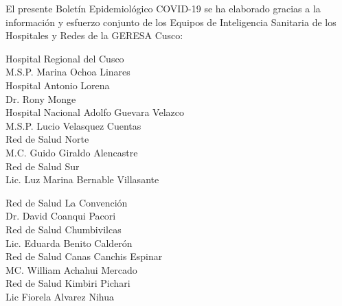 \documentclass[12pt,a4paper,openany]{book}
\begin{document}
	\centering
		{\large El presente Boletín Epidemiológico COVID-19 se ha elaborado gracias a la información y esfuerzo conjunto de los Equipos de Inteligencia Sanitaria de los Hospitales y Redes de la GERESA Cusco:

		\vspace{0.5cm}
		\noindent
		\begin{minipage}[t]{.45\textwidth}
			\centering
			Hospital Regional del Cusco \\
			M.S.P. Marina Ochoa Linares \vspace{0.5cm}\\
			Hospital Antonio Lorena \\
			Dr. Rony Monge \vspace{.5cm}\\
			Hospital Nacional Adolfo Guevara Velazco\\
			M.S.P. Lucio Velasquez Cuentas \vspace{.5cm}\\
			Red de Salud Norte \\
			M.C. Guido Giraldo Alencastre\vspace{0.5cm}\\
			Red de Salud Sur\\
			Lic. Luz Marina Bernable Villasante \vspace{0.5cm}\\	
		\end{minipage}
		\hfill
		\noindent
		\begin{minipage}[t]{.45\textwidth}
			\centering
			Red de Salud La Convención\\
			Dr. David Coanqui Pacori\vspace{0.5cm}\\
			Red de Salud Chumbivilcas\\
			Lic. Eduarda Benito Calderón \vspace{.5cm}\\
			Red de Salud Canas Canchis Espinar\\
			MC. William Achahui Mercado \vspace{.5cm}\\
			Red de Salud Kimbiri Pichari \\
			Lic Fiorela Alvarez Nihua\vspace{0.5cm}\\	
		\end{minipage}
}
\end{document}
